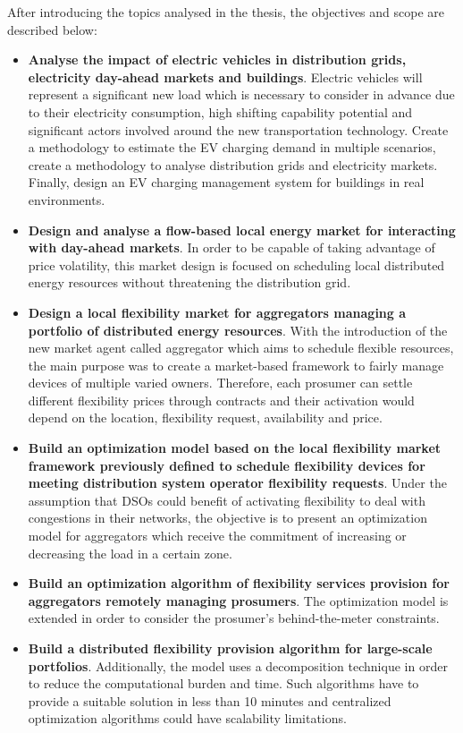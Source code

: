 After introducing the topics analysed in the thesis, the objectives and scope are described below:

\begin{itemize}
	\item \textbf{Analyse the impact of electric vehicles in distribution grids, electricity day-ahead markets and buildings}. Electric vehicles will represent a significant new load which is necessary to consider in advance due to their electricity consumption, high shifting capability potential and significant actors involved around the new transportation technology.
	Create a methodology to estimate the EV charging demand in multiple scenarios, create a methodology to analyse distribution grids and electricity markets. Finally, design an EV charging management system for buildings in real environments.
	
	\item \textbf{Design and analyse a flow-based local energy market for interacting with day-ahead markets}. In order to be capable of taking advantage of price volatility, this market design is focused on scheduling local distributed energy resources without threatening the distribution grid.
	
    \item \textbf{Design a local flexibility market for aggregators managing a portfolio of distributed energy resources}. With the introduction of the new market agent called aggregator which aims to schedule flexible resources, the main purpose was to create a market-based framework to fairly manage devices of multiple varied owners. Therefore, each prosumer can settle different flexibility prices through contracts and their activation would depend on the location, flexibility request, availability and price.
      	
	\item \textbf{Build an optimization model based on the local flexibility market framework previously defined to schedule flexibility devices for meeting distribution system operator flexibility requests}. Under the assumption that DSOs could benefit of activating flexibility to deal with congestions in their networks, the objective is to present an optimization model for aggregators which receive the commitment of increasing or decreasing the load in a certain zone. 
	
	\item \textbf{Build an optimization algorithm of flexibility services provision for aggregators remotely managing prosumers}. The optimization model is extended in order to consider the prosumer's behind-the-meter constraints. 
	
	\item \textbf{Build a distributed flexibility provision algorithm for large-scale portfolios}. Additionally, the model uses a decomposition technique in order to reduce the computational burden and time. Such algorithms have to provide a suitable solution in less than 10 minutes and centralized optimization algorithms could have scalability limitations.	
	
\end{itemize}

